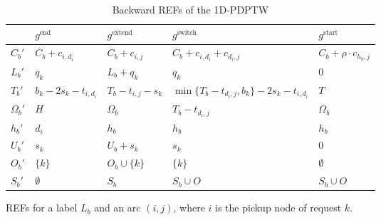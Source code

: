\documentclass[preprint,11pt,authoryear]{elsarticle}
\begin{document}
\begin{table}[!ht]
\caption{Backward REFs of the 1D-PDPTW}
\label{tab:backward-refs}
\footnotesize
\renewcommand{\arraystretch}{1.6}
\setlength{\tabcolsep}{5pt}
\begin{tabularx}{\linewidth}{@{}l Y Y Y Y@{}}
\toprule
 & $g^{\mathrm{end}}$ & $g^{\mathrm{extend}}$ & $g^{\mathrm{switch}}$ & $g^{\mathrm{start}}$ \\
\midrule

$C_b'$
& $C_b + c_{i,d_i}$
& $C_b + c_{i,j}$
& $C_b + c_{i,d_i} + c_{d_i,j}$
& $C_b + \rho \cdot c_{h_b,j}$ \\

$L_b'$
& $q_k$
& $L_b + q_k$
& $q_k$
& $0$ \\

$T_b'$
& $b_k - 2 s_k - t_{i,d_i}$
& $T_b - t_{i,j} - s_k$
& $ \min\{T_b - t_{d_i,j}, b_k\} - 2 s_k - t_{i,d_i}$
& $T$ \\

$\Omega_b'$
& $H$
& $\Omega_b$
& $T_b - t_{d_i,j}$
& $\Omega_b$ \\

$h_b'$
& $d_i$
& $h_b$
& $h_b$
& $h_b$ \\

$U_b'$
& $s_k$
& $U_b + s_k$
& $s_k$
& $0$ \\

$O_b'$
& $\{k\}$
& $O_b \cup \{k\}$
& $\{k\}$
& $\emptyset$ \\

$S_b'$
& $\emptyset$
& $S_b$
& $S_b \cup O$
& $S_b \cup O$ \\

\bottomrule
\end{tabularx}
\par\smallskip
{\footnotesize\raggedright
REFs for a label $L_b$ and an arc $(i,j)$, where $i$ is the pickup node of request $k$.\par}
\end{table}
\end{document}
